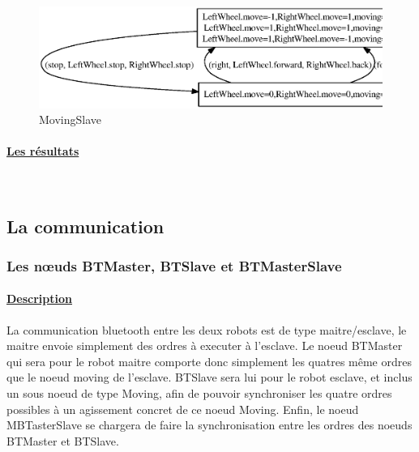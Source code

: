     \begin{figure}[!ht]
     \begin{center}
      \includegraphics[width=16cm]{../src/altarica/MovingSlave.eps}
      \caption{MovingSlave}
     \end{center}
    \end{figure}

    \paragraph{\underline{Les résultats\\}}
    
    
    ~\newline
    
    
    
  \subsection{La communication}
    
   \subsubsection{Les n\oe{}uds BTMaster, BTSlave et BTMasterSlave}
    
    \paragraph{\underline{Description}\\}
    La communication bluetooth entre les deux robots est de type
    maitre/esclave, le maitre envoie simplement des ordres à executer à
    l'esclave. Le noeud BTMaster qui sera pour le robot maitre comporte
    donc simplement les quatres même ordres que le noeud moving de l'esclave. BTSlave
    sera lui pour le robot esclave, et inclus un sous noeud de type
    Moving, afin de pouvoir synchroniser les quatre ordres possibles à un
    agissement concret de ce noeud Moving. Enfin, le noeud MBTasterSlave se
    chargera de faire la synchronisation entre les ordres des noeuds
    BTMaster et BTSlave.

